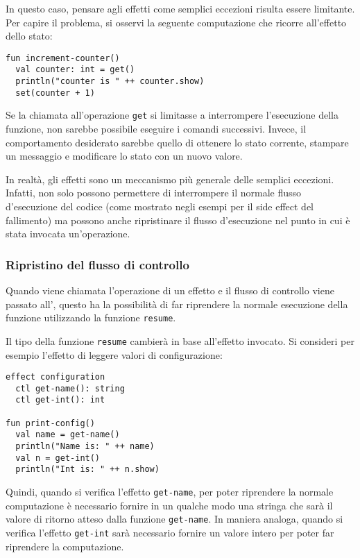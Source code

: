 In questo caso, pensare agli effetti come semplici eccezioni risulta essere limitante. Per capire il problema, si osservi la seguente computazione che ricorre all'effetto dello stato:
\begin{lstlisting}[language=koka]
fun increment-counter()
  val counter: int = get()
  println("counter is " ++ counter.show)
  set(counter + 1)
\end{lstlisting}
Se la chiamata all'operazione \lstinline{get} si limitasse a interrompere l'esecuzione della funzione, non sarebbe possibile eseguire i comandi successivi. Invece, il comportamento desiderato sarebbe quello di ottenere lo stato corrente, stampare un messaggio e modificare lo stato con un nuovo valore.

In realtà, gli effetti sono un meccanismo più generale delle semplici eccezioni. Infatti, non solo possono permettere di interrompere il normale flusso d'esecuzione del codice (come mostrato negli esempi per il side effect del fallimento) ma possono anche ripristinare il flusso d'esecuzione nel punto in cui è stata invocata un'operazione.

\subsubsection{Ripristino del flusso di controllo}
Quando viene chiamata l'operazione di un effetto e il flusso di controllo viene passato all', questo ha la possibilità di far riprendere la normale esecuzione della funzione utilizzando la funzione \lstinline{resume}.

Il tipo della funzione \lstinline{resume} cambierà in base all'effetto invocato. Si consideri per esempio l'effetto di leggere valori di configurazione:
\begin{lstlisting}[language=koka]
effect configuration
  ctl get-name(): string
  ctl get-int(): int

fun print-config()
  val name = get-name()
  println("Name is: " ++ name)
  val n = get-int()
  println("Int is: " ++ n.show)
\end{lstlisting}

Quindi, quando si verifica l'effetto \lstinline{get-name}, per poter riprendere la normale computazione è necessario fornire in un qualche modo una stringa che sarà il valore di ritorno atteso dalla funzione \lstinline{get-name}. In maniera analoga, quando si verifica l'effetto \lstinline{get-int} sarà necessario fornire un valore intero per poter far riprendere la computazione.

